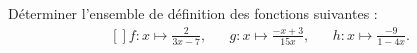 
\begin{exercice}\label{exosmath-0137}

    Déterminer l'ensemble de définition des fonctions suivantes :
    \begin{equation}
        \begin{aligned}[]
            f\colon x\mapsto \frac{ 2 }{ 3x-7 },&&g\colon x\mapsto \frac{ -x+3 }{ 15x },&&h\colon x\mapsto \frac{ -9 }{ 1-4x }.
        \end{aligned}
    \end{equation}

\end{exercice}
